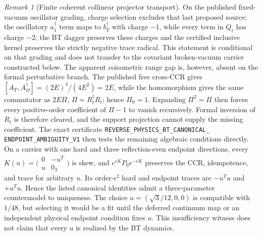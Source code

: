 \documentclass[11pt]{article}
\theoremstyle{definition}
\theoremstyle{remark}
\newtheorem{remark}[theorem]{Remark}
\begin{document}
\begin{remark}[Finite coherent collinear projector transport]
On the published fixed-vacuum oscillator grading, charge selection excludes
that last proposed source: the oscillatory $a_1^\dagger$ term maps to
$b_\Upsilon^\dagger$ with charge $-1$, while every term in $Q_t$ has charge
$-2$; the BT dagger preserves these charges and the certified inclusive kernel
preserves the strictly negative trace radical.  This statement is conditional
on that grading and does not transfer to the covariant broken-vacuum carrier
constructed below.  The apparent coisometric range
gap is, however, absent on the formal perturbative branch.  The published free
cross-CCR gives
$[A_\Upsilon,A_\Omega^\dagger]=(2E)^3/(4E^2)=2E$, while the homomorphism gives
the same commutator as $2E\Pi$, $\Pi=R_t^\dagger R_t$; hence $\Pi_0=1$.
Expanding $\Pi^2=\Pi$ then forces every positive-order coefficient of $\Pi-1$
to vanish recursively.  Formal inversion of $R_t$ is therefore cleared, and
the support projection cannot supply the missing coefficient.  The exact
certificate
\texttt{REVERSE\_PHYSICS\_BT\_CANONICAL\_}
\allowbreak\texttt{ENDPOINT\_AMBIGUITY\_V1}
then tests the remaining algebraic conditions directly.  On a carrier with
one hard and three reflection-even endpoint directions, every
$K(u)=\bigl(\begin{smallmatrix}0&-u^T\\u&0_3\end{smallmatrix}\bigr)$ is skew,
and $e^{\epsilon K}P_0e^{-\epsilon K}$ preserves the CCR, idempotence, and
trace for arbitrary $u$.  Its order-$\epsilon^2$ hard and endpoint traces are
$-u^Tu$ and $+u^Tu$.  Hence the listed canonical identities admit a
three-parameter countermodel to uniqueness.  The choice
$u=(\sqrt3/12,0,0)$ is compatible with $1/48$, but selecting it would be a fit
until the deferred continuum map or an independent physical endpoint
condition fixes $u$.  This insufficiency witness does not claim that every
$u$ is realized by the BT dynamics.


\end{remark}
\end{document}
